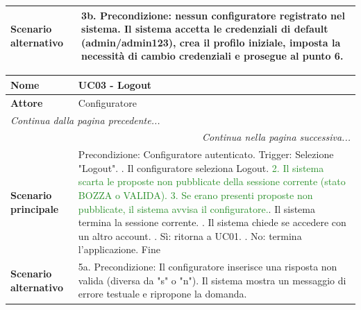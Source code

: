 \documentclass[12pt, a4paper, oneside]{report}
\begin{document}
\begin{tabularx}{\textwidth}{|l|X|}
    \textbf{Scenario alternativo} & 
    3b. Precondizione: nessun configuratore registrato nel sistema.\newline
    Il sistema accetta le credenziali di default (admin/admin123), crea il profilo iniziale, imposta la necessità di cambio credenziali e prosegue al punto 6. \\ \hline
\end{tabularx}

\renewcommand{\arraystretch}{1.4} 

\begin{tabularx}{\textwidth}{|l|X|}
    \hline
    \textbf{Nome}               & \textbf{UC03 - Logout} \\ \hline
    \textbf{Attore}             & Configuratore \\ \hline
    \endfirsthead 

    \hline
    \multicolumn{2}{|l|}{\textit{Continua dalla pagina precedente...}} \\ \hline
    \endhead 

    \hline
    \multicolumn{2}{|r|}{\textit{Continua nella pagina successiva...}} \\ \hline
    \endfoot 

    \hline
    \endlastfoot

    \textbf{Scenario principale} & 
    Precondizione: Configuratore autenticato. \newline
    Trigger: Selezione "Logout". \newline
    1. Il configuratore seleziona Logout. \newline
    \textcolor{ForestGreen}{2. Il sistema scarta le proposte non pubblicate della sessione corrente (stato BOZZA o VALIDA).}\newline
    \textcolor{ForestGreen}{3. Se erano presenti proposte non pubblicate, il sistema avvisa il configuratore.}\newline
    4. Il sistema termina la sessione corrente. \newline
    5. Il sistema chiede se accedere con un altro account. \newline
    6. Sì: ritorna a UC01. \newline
    7. No: termina l'applicazione. \newline
    Fine \\ \hline
    
    \textbf{Scenario alternativo} & 
    5a. Precondizione: Il configuratore inserisce una risposta non valida (diversa da "s" o "n").\newline
    Il sistema mostra un messaggio di errore testuale e ripropone la domanda. \\ \hline
\end{tabularx}
\end{document}
